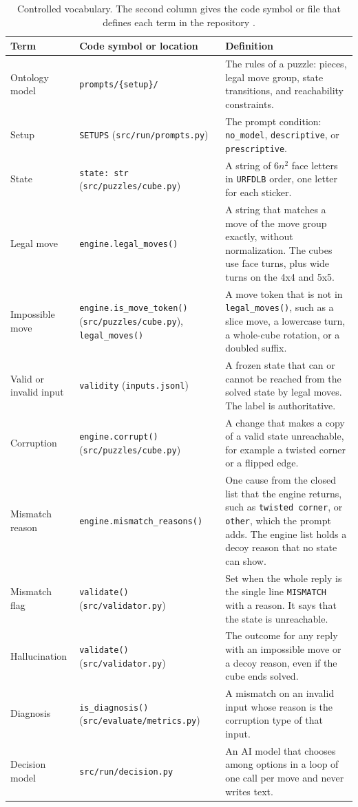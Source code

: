 \documentclass[10pt,twocolumn,letterpaper]{article}
\newcommand{\code}[1]{\texttt{#1}}
\begin{document}
\begin{table}[t]
\caption{Controlled vocabulary. The second column gives the code symbol or file that defines each term in the repository \citep{flaksrepo}.}
\label{tab:vocab}
\small
\begin{tabularx}{\textwidth}{@{}p{}p{}X@{}}
\toprule
Term & Code symbol or location & Definition \\
\midrule
Ontology model & \code{prompts/\{setup\}/} & The rules of a puzzle: pieces, legal move group, state transitions, and reachability constraints. \\
Setup & \code{SETUPS} (\code{src/run/prompts.py}) & The prompt condition: \code{no\_model}, \code{descriptive}, or \code{prescriptive}. \\
State & \code{state: str} (\code{src/puzzles/cube.py}) & A string of $6n^2$ face letters in \code{URFDLB} order, one letter for each sticker. \\
Legal move & \code{engine.legal\_moves()} & A string that matches a move of the move group exactly, without normalization. The cubes use face turns, plus wide turns on the 4x4 and 5x5. \\
Impossible move & \code{engine.is\_move\_token()} (\code{src/puzzles/cube.py}), \code{legal\_moves()} & A move token that is not in \code{legal\_moves()}, such as a slice move, a lowercase turn, a whole-cube rotation, or a doubled suffix. \\
Valid or invalid input & \code{validity} (\code{inputs.jsonl}) & A frozen state that can or cannot be reached from the solved state by legal moves. The label is authoritative. \\
Corruption & \code{engine.corrupt()} (\code{src/puzzles/cube.py}) & A change that makes a copy of a valid state unreachable, for example a twisted corner or a flipped edge. \\
Mismatch reason & \code{engine.mismatch\_reasons()} & One cause from the closed list that the engine returns, such as \code{twisted corner}, or \code{other}, which the prompt adds. The engine list holds a decoy reason that no state can show. \\
Mismatch flag & \code{validate()} (\code{src/validator.py}) & Set when the whole reply is the single line \code{MISMATCH} with a reason. It says that the state is unreachable. \\
Hallucination & \code{validate()} (\code{src/validator.py}) & The outcome for any reply with an impossible move or a decoy reason, even if the cube ends solved. \\
Diagnosis & \code{is\_diagnosis()} (\code{src/evaluate/metrics.py}) & A mismatch on an invalid input whose reason is the corruption type of that input. \\
Decision model & \code{src/run/decision.py} & An AI model that chooses among options in a loop of one call per move and never writes text. \\
\bottomrule
\end{tabularx}
\end{table}
\end{document}
